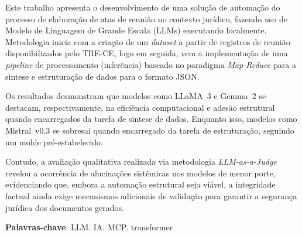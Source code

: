 Este trabalho apresenta o desenvolvimento de uma solução de automação do processo de elaboração de atas de reunião no contexto jurídico, fazendo uso de Modelo de Linguagem de Grande Escala (LLMs) executando localmente. Metodologia inicia com a criação de um \textit{dataset} a partir de registros de reunião disponibilizados pelo TRE-CE, logo em seguida, vem a implementação de uma \textit{pipeline} de processamento (inferência) baseado no paradigma \textit{Map-Reduce} para a sintese e estruturação de dados para o formato JSON.

Os resultados desmonstram que modelos como LLaMA~3 e Gemma~2 se destacam, respectivamente, na eficiência computacional e adesão estrutural quando encarregados da tarefa de sintese de dados. Enquanto isso, modelos como Mistral~v0.3 se sobresai quando encarregado da tarefa de estruturação, seguindo um molde pré-estabelecido.

Contudo, a avaliação qualitativa realizada via metodologia \textit{LLM-as-a-Judge} revelou a ocorrência de alucinações sistêmicas nos modelos de menor porte, evidenciando que, embora a automação estrutural seja viável, a integridade factual ainda exige mecanismos adicionais de validação para garantir a segurança jurídica dos documentos gerados.


\textbf{Palavras-chave}: LLM. IA. MCP. transformer